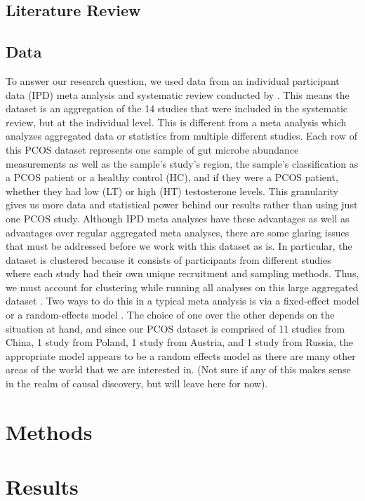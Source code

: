 \documentclass[12pt,letterpaper]{article}
\begin{document}
\subsection{Literature Review}

\subsection{Data}
To answer our research question, we used data from an individual participant data (IPD) meta analysis and systematic review conducted by \citep{yang2024pcos}. This means the dataset is an aggregation of the 14 studies that were included in the systematic review, but at the individual level. This is different from a meta analysis which analyzes aggregated data or statistics from multiple different studies. Each row of this PCOS dataset represents one sample of gut microbe abundance measurements as well as the sample's study's region, the sample's classification as a PCOS patient or a healthy control (HC), and if they were a PCOS patient, whether they had low (LT) or high (HT) testosterone levels. This granularity gives us more data and statistical power behind our results rather than using just one PCOS study. Although IPD meta analyses have these advantages as well as advantages over regular aggregated meta analyses, there are some glaring issues that must be addressed before we work with this dataset as is. In particular, the dataset is clustered because it consists of participants from different studies where each study had their own unique recruitment and sampling methods. Thus, we must account for clustering while running all analyses on this large aggregated dataset \citep{riley2010ipdma}. Two ways to do this in a typical meta analysis is via a fixed-effect model or a random-effects model \citep{dettori2022fixedrandomeffect}. The choice of one over the other depends on the situation at hand, and since our PCOS dataset is comprised of 11 studies from China, 1 study from Poland, 1 study from Austria, and 1 study from Russia, the appropriate model appears to be a random effects model as there are many other areas of the world that we are interested in. (Not sure if any of this makes sense in the realm of causal discovery, but will leave here for now). 

\section{Methods}

\section{Results}
\end{document}
